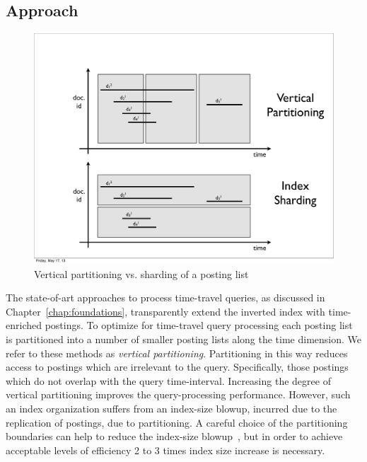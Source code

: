 \subsection{Approach}
\label{chap:sharding:sec:approach}

\begin{figure}[htb]
  	\centering
		\includegraphics[width=\textwidth]{resources/sharding-vs-vert.pdf}
   	\caption{Vertical partitioning vs. sharding of a posting list}
		  \label{fig:hor_vs_vert}	
\end{figure} 

The state-of-art approaches to process time-travel queries, as discussed in Chapter~\ref{chap:foundations}, transparently extend the inverted index with time-enriched postings. To optimize for time-travel query processing each posting list is partitioned into a number of smaller posting lists along the time dimension. We refer to these methods as \emph{vertical partitioning}. Partitioning in this way reduces access to postings which are irrelevant to the query. Specifically, those postings which do not overlap with the query time-interval. Increasing the degree of vertical partitioning improves the query-processing performance. However, such an index organization suffers from an index-size blowup, incurred due to the replication of postings, due to partitioning. A careful choice of the partitioning boundaries can help to reduce the index-size blowup~\cite{kberberi:sigir2007}, but in order to achieve acceptable levels of efficiency 2 to 3 times index size increase is necessary.

